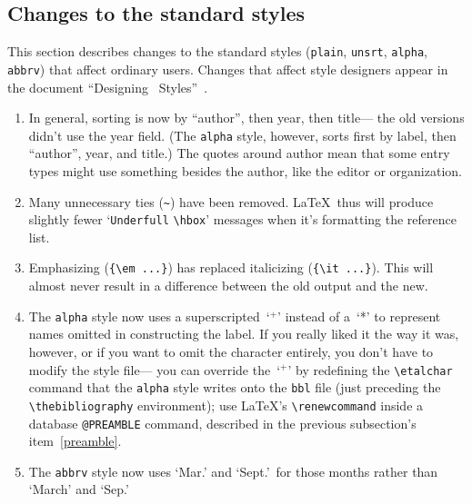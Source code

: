 \subsection{Changes to the standard styles}

This section describes changes to the standard styles
({\tt plain}, {\tt unsrt}, {\tt alpha}, {\tt abbrv})
that affect ordinary users.
Changes that affect style designers appear in
the document ``Designing \BibTeX\ Styles''~\cite{btxhak}.
\begin{enumerate}

\item
In general, sorting is now by ``author''$\!$, then year, then title---%
the old versions didn't use the year field.
(The {\tt alpha} style, however, sorts first by label,
then ``author''$\!$, year, and title.)
The quotes around author mean that some entry types
might use something besides the author, like the editor or organization.

\item
Many unnecessary ties (\verb|~|) have been removed.
\LaTeX\ thus will produce slightly fewer
`\hbox{\tt Underfull} \verb|\hbox|' messages
when it's formatting the reference list.

\item
Emphasizing (\hbox{\verb|{\em ...}|})
has replaced italicizing (\hbox{\verb|{\it ...}|}).
This will almost never result in a difference
between the old output and the new.

\item
The {\tt alpha} style now uses a superscripted~`$^{+}$' instead of a~`*'
to represent names omitted in constructing the label.
If you really liked it the way it was, however,
or if you want to omit the character entirely,
you don't have to modify the style file---%
you can override the~`$^{+}$' by
redefining the \hbox{\verb|\etalchar|} command
that the {\tt alpha} style writes onto the {\tt bbl} file
(just preceding the \hbox{\verb|\thebibliography|} environment);
use \LaTeX's \hbox{\verb|\renewcommand|} inside
a database \hbox{\tt @PREAMBLE} command,
described in the previous subsection's item~\ref{preamble}.

\item
The {\tt abbrv} style now uses `Mar.' and `Sept.'\
for those months rather than `March' and `Sep.'


\end{enumerate}

